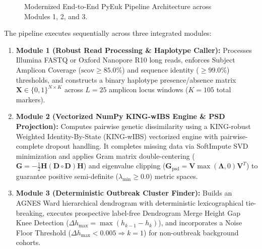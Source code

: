 \documentclass[11pt,a4paper]{article}
\begin{document}
\begin{figure}[h]
\centering
{}
\caption{Modernized End-to-End PyEuk Pipeline Architecture across Modules 1, 2, and 3.}
\label{fig:modern_arch}
\end{figure}

The pipeline executes sequentially across three integrated modules:
\begin{enumerate}[leftmargin=*]
    \item \textbf{Module 1 (Robust Read Processing \& Haplotype Caller):} Processes Illumina FASTQ or Oxford Nanopore R10 long reads, enforces Subject Amplicon Coverage ($\text{scov} \ge 85.0\%$) and sequence identity ($\ge 99.0\%$) thresholds, and constructs a binary haplotype presence/absence matrix $\mathbf{X} \in \{0, 1\}^{N \times K}$ across $L=25$ amplicon locus windows ($K=105$ total markers).
    \item \textbf{Module 2 (Vectorized NumPy KING-wIBS Engine \& PSD Projection):} Computes pairwise genetic dissimilarity using a KING-robust Weighted Identity-By-State (KING-wIBS) vectorized engine with pairwise-complete dropout handling. It completes missing data via SoftImpute SVD minimization and applies Gram matrix double-centering ($\mathbf{G} = -\frac{1}{2} \mathbf{H} (\mathbf{D} \circ \mathbf{D}) \mathbf{H}$) and eigenvalue clipping ($\mathbf{G}_{\text{psd}} = \mathbf{V} \max(\mathbf{\Lambda}, 0) \mathbf{V}^T$) to guarantee positive semi-definite ($\lambda_{\text{min}} \ge 0.0$) metric spaces.
    \item \textbf{Module 3 (Deterministic Outbreak Cluster Finder):} Builds an AGNES Ward hierarchical dendrogram with deterministic lexicographical tie-breaking, executes prospective label-free Dendrogram Merge Height Gap Knee Detection ($\Delta h_{\text{max}} = \max (h_{k-1} - h_k)$), and incorporates a Noise Floor Threshold ($\Delta h_{\text{max}} < 0.005 \Rightarrow k=1$) for non-outbreak background cohorts.
\end{enumerate}
\end{document}
